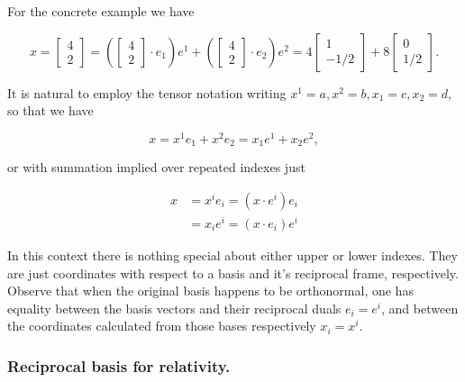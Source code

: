 For the concrete example we have

\begin{equation}\label{eqn:grahamSchmidtLorentz:290}
x = 
\begin{bmatrix}
4 \\
2
\end{bmatrix} 
=
\left(
\begin{bmatrix}
4 \\
2
\end{bmatrix} 
\cdot e_1
\right)
e^1
+
\left(
\begin{bmatrix}
4 \\
2
\end{bmatrix} 
\cdot e_2
\right)
e^2
= 4 
\begin{bmatrix}
1 \\
-1/2
\end{bmatrix} 
+ 
8
\begin{bmatrix}
0 \\
1/2
\end{bmatrix}.
\end{equation}

It is natural to employ the tensor notation writing $x^1 = a, x^2 = b, x_1 = c, x_2 = d$, so that we have

\begin{equation}\label{eqn:grahamSchmidtLorentz:310}
x = x^1 e_1 + x^2 e_2 = x_1 e^1 + x_2 e^2,
\end{equation}

or with summation implied over repeated indexes just

\begin{equation}\label{eqn:grahamSchmidtLorentz:330}
\begin{aligned}
x &= x^i e_i = (x \cdot e^i) e_i \\
  &= x_i e^i = (x \cdot e_i) e^i
\end{aligned}
\end{equation}

In this context there is nothing special about either upper or lower indexes.  They are just coordinates with respect to a basis and it's reciprocal frame, respectively.  Observe that when the original basis happens to be orthonormal, one has equality between the basis vectors and their reciprocal duals $e_i = e^i$, and between the coordinates calculated from those bases respectively $x_i = x^i$.

\subsubsection{Reciprocal basis for relativity.}


